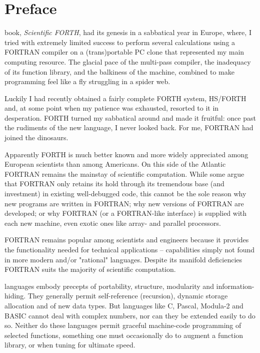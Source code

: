 
\chapter*{Preface}
\thispagestyle{fancy}

 book, \textit{Scientific FORTH}, had its genesis in a sabbatical year in Europe, where, I tried with extremely limited success to perform several calculations using a FORTRAN compiler on a (trans)portable PC clone that represented my main computing resource. The glacial pace of the multi-pass compiler, the inadequacy of its function library, and the balkiness of the machine, combined to make programming feel like a fly struggling in a spider web.

Luckily I had recently obtained a fairly complete FORTH system, HS/FORTH  and, at some point when my patience was exhausted, resorted to it in desperation. FORTH turned my sabbatical around and made it fruitful: once past the rudiments of the new language, I never looked back. For me, FORTRAN had joined the dinosaurs.

Apparently FORTH is much better known and more widely appreciated among European scientists than among Americans. On this side of the Atlantic FORTRAN remains the mainstay of scientific computation. While some argue that FORTRAN only retains its hold through its tremendous base (and investment) in existing well-debugged code, this cannot be the sole reason why new programs are written in FORTRAN; why new versions of FORTRAN are developed; or why FORTRAN (or a FORTRAN-like interface) is supplied with each new machine, even exotic ones like array- and parallel processors.

FORTRAN remains popular among scientists and engineers because it provides the functionality needed for technical applications -- capabilities simply not found in more modern and/or "rational" languages. Despite its manifold deficiencies FORTRAN suits the majority of scientific computation.

 languages embody precepts of portability, structure, modularity and information-hiding. They generally permit self-reference (recursion), dynamic storage allocation and of new data types. But languages like C, Pascal, Modula-2 and BASIC cannot deal with complex numbers, nor can they be extended easily to do so. Neither do these languages permit graceful machine-code programming of selected functions, something one must occasionally do to augment a function library, or when tuning for ultimate speed.
 
